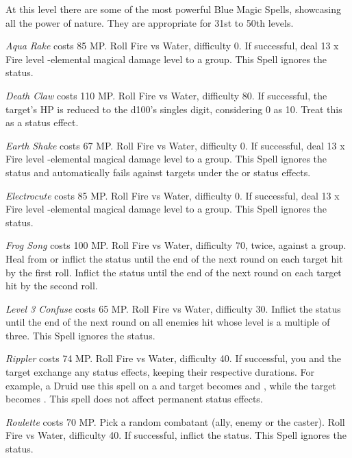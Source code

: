 \begin{multicols}{2}
	At this level there are some of the most powerful Blue Magic Spells, showcasing all the power of nature. They are appropriate for 31st to 50th levels.

    \textit{Aqua Rake} costs 85 MP\@. Roll Fire vs Water, difficulty 0. If successful, deal 13 x Fire level -elemental magical damage level to a group. This Spell ignores the  status.

    \textit{Death Claw} costs 110 MP\@. Roll Fire vs Water, difficulty 80. If successful, the target's HP is reduced to the d100’s singles digit, considering 0 as 10. Treat this as a  status effect.
    
    \textit{Earth Shake} costs 67 MP\@. Roll Fire vs Water, difficulty 0. If successful, deal 13 x Fire level -elemental magical damage level to a group. This Spell ignores the  status and automatically fails against targets under the  or  status effects.
    
    \textit{Electrocute} costs 85 MP\@. Roll Fire vs Water, difficulty 0. If successful, deal 13 x Fire level -elemental magical damage level to a group. This Spell ignores the  status.
    
    \textit{Frog Song} costs 100 MP\@. Roll Fire vs Water, difficulty 70, twice, against a group. Heal from or inflict the  status until the end of the next round on each target hit by the first roll. Inflict the  status until the end of the next round on each target hit by the second roll.
    
    \textit{Level 3 Confuse} costs 65 MP\@. Roll Fire vs Water, difficulty 30. Inflict the  status until the end of the next round on all enemies hit whose level is a multiple of three. This Spell ignores the  status.
    
    \textit{Rippler} costs 74 MP\@. Roll Fire vs Water, difficulty 40. If successful, you and the target exchange any status effects, keeping their respective durations. For example, a  Druid use this spell on a  and  target becomes  and , while the target becomes . This spell does not affect permanent status effects.
    
    \textit{Roulette} costs 70 MP\@. Pick a random combatant (ally, enemy or the caster). Roll Fire vs Water, difficulty 40. If successful, inflict the  status. This Spell ignores the  status.
    

\end{multicols}
